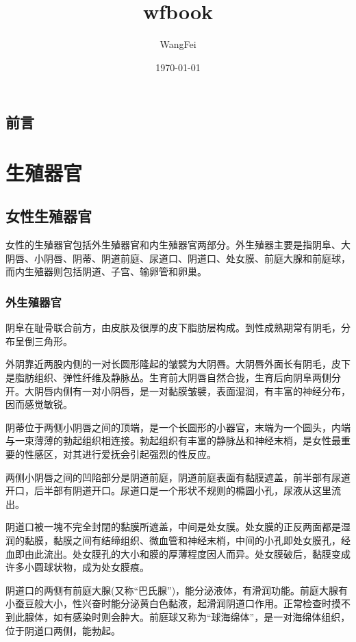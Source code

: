 \documentclass[12pt,UTF8]{ctexbook}
\title{\heiti\zihao{0} wfbook}
\author{WangFei}
\date{\today}
\begin{document}
\maketitle
\tableofcontents

\frontmatter

\chapter{前言}



\mainmatter

\part{生殖器官}

\chapter{女性生殖器官}

女性的生殖器官包括外生殖器官和内生殖器官两部分。外生殖器主要是指阴阜、大阴唇、小阴唇、阴蒂、阴道前庭、尿道口、阴道口、处女膜、前庭大腺和前庭球，而内生殖器则包括阴道、子宫、输卵管和卵巢。

\section{外生殖器官}

阴阜在耻骨联合前方，由皮肤及很厚的皮下脂肪层构成。到性成熟期常有阴毛，分布呈倒三角形。

外阴靠近两股内侧的一对长圆形隆起的皱襞为大阴唇。大阴唇外面长有阴毛，皮下是脂肪组织、弹性纤维及静脉丛。生育前大阴唇自然合拢，生育后向阴阜两侧分开。大阴唇内侧有一对小阴唇，是一对黏膜皱襞，表面湿润，有丰富的神经分布，因而感觉敏锐。

阴蒂位于两侧小阴唇之间的顶端，是一个长圆形的小器官，末端为一个圆头，内端与一束薄薄的勃起组织相连接。勃起组织有丰富的静脉丛和神经末梢，是女性最重要的性感区，对其进行爱抚会引起强烈的性反应。

两侧小阴唇之间的凹陷部分是阴道前庭，阴道前庭表面有黏膜遮盖，前半部有尿道开口，后半部有阴道开口。尿道口是一个形状不规则的橢圆小孔，尿液从这里流出。

阴道口被一塊不完全封閉的黏膜所遮盖，中间是处女膜。处女膜的正反两面都是湿润的黏膜，黏膜之间有结缔组织、微血管和神经末梢，中间的小孔即处女膜孔，经血即由此流出。处女膜孔的大小和膜的厚薄程度因人而异。处女膜破后，黏膜变成许多小圆球状物，成为处女膜痕。

阴道口的两侧有前庭大腺(又称“巴氏腺”)，能分泌液体，有滑润功能。前庭大腺有小蚕豆般大小，性兴奋时能分泌黄白色黏液，起滑润阴道口作用。正常检查时摸不到此腺体，如有感染时则会肿大。前庭球又称为“球海绵体”，是一对海绵体组织，位于阴道口两侧，能勃起。
\end{document}

